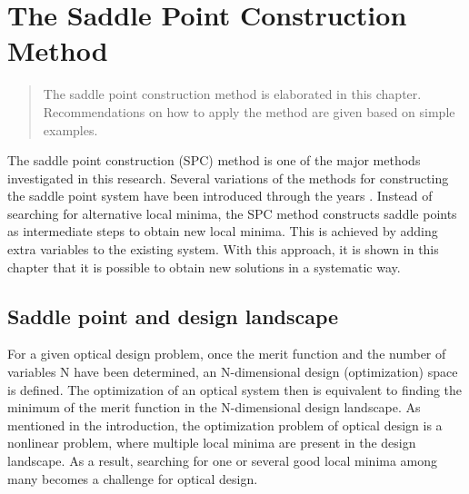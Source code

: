 \chapter{The Saddle Point Construction Method}
\label{chapter_SPC_method_reccomendation}
\graphicspath{ {./chapter-sp/figures/} }
\captionsetup[figure]{labelfont=bf}
\captionsetup{margin=1.5em}
\captionsetup[table]{labelfont=bf}




\begin{abstract}
The saddle point construction method is elaborated in this chapter. Recommendations on how to apply the method are given based on simple examples.
\end{abstract}

\newpage

\noindent 
The saddle point construction (SPC) method is one of the major methods investigated in this research. Several variations of the methods for constructing the saddle point system have been introduced through the years \cite{BociortSPCSexplained}\cite{MVTurnhoutSPC15}\cite{HouProc2015}. Instead of searching for alternative local minima, the SPC method constructs saddle points as intermediate steps to obtain new local minima. This is achieved by adding extra variables to the existing system. With this approach, it is shown in this chapter that it is possible to obtain new solutions in a systematic way. 

\section{Saddle point and design landscape}
For a given optical design problem, once the merit function and the number of variables N have been determined, an N-dimensional design (optimization) space is defined. The optimization of an optical system then is equivalent to finding the minimum of the merit function in the N-dimensional design landscape. As mentioned in the introduction, the optimization problem of optical design is a nonlinear problem, where multiple local minima are present in the design landscape. As a result, searching for one or several good local minima among many becomes a challenge for optical design. 

